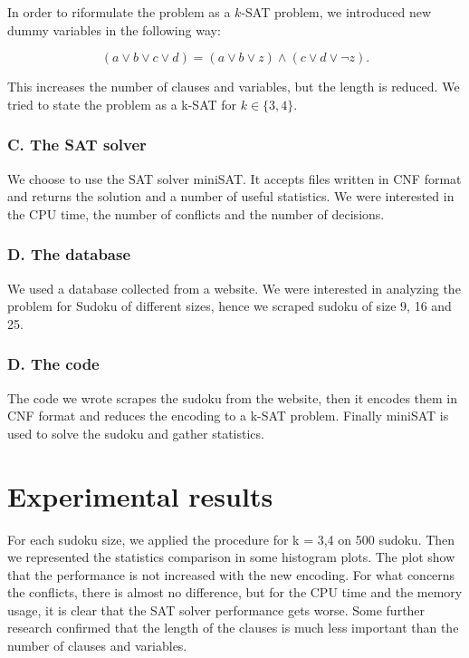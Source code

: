 \documentclass[journal, a4paper]{IEEEtran}
\begin{document}
	In order to riformulate the problem as a $k$-SAT problem, we introduced new dummy variables in the following way:
	
\begin{equation*}
	(a \lor b \lor c \lor d ) = (a \lor b \lor z) \land (c \lor d \lor \neg z).
\end{equation*}
	
	This increases the number of clauses and variables, but the length is reduced. We tried to state the problem as a k-SAT for $k \in \{ 3, 4\}$. 
	
\subsubsection*{C. The SAT solver}
	We choose to use the SAT solver miniSAT. It accepts files written in CNF format and returns the solution and a number of useful statistics. We were interested in the CPU time, the number of conflicts and the number of decisions.
	
\subsubsection*{D. The database}
	
	We used a database collected from a website. We were interested in analyzing the problem for Sudoku of different sizes, hence we scraped sudoku of size 9, 16 and 25.
	
\subsubsection*{D. The code}
	
	The code we wrote scrapes the sudoku from the website, then it encodes them in CNF format and reduces the encoding to a k-SAT problem. Finally miniSAT is used to solve the sudoku and gather statistics.
	

\section{Experimental results}
	
	For each sudoku size, we applied the procedure for k = 3,4 on 500 sudoku. Then we represented the statistics comparison in some histogram plots. The plot show that the performance is not increased with the new encoding. For what concerns the conflicts, there is almost no difference, but for the CPU time and the memory usage, it is clear that the SAT solver performance gets worse. Some further research confirmed that the length of the clauses is much less important than the number of clauses and variables.
	
\end{document}
